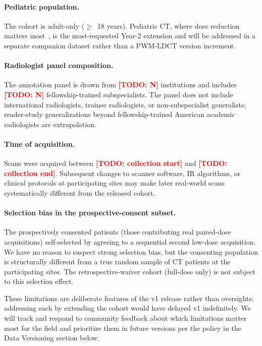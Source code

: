 \documentclass[twoside,11pt]{article}
\newcommand{\todo}[1]{\textcolor{red}{\textbf{[TODO: #1]}}}
\begin{document}
\paragraph{Pediatric population.} The cohort is adult-only ($\geq$~18 years). Pediatric CT, where dose reduction matters most~\citep{larson2018pediatric}, is the most-requested Year-2 extension and will be addressed in a separate companion dataset rather than a PWM-LDCT version increment.

\paragraph{Radiologist panel composition.} The annotation panel is drawn from \todo{N} institutions and includes \todo{N} fellowship-trained subspecialists. The panel does not include international radiologists, trainee radiologists, or non-subspecialist generalists; reader-study generalizations beyond fellowship-trained American academic radiologists are extrapolation.

\paragraph{Time of acquisition.} Scans were acquired between \todo{collection start} and \todo{collection end}. Subsequent changes to scanner software, IR algorithms, or clinical protocols at participating sites may make later real-world scans systematically different from the released cohort.

\paragraph{Selection bias in the prospective-consent subset.} The prospectively consented patients (those contributing real paired-dose acquisitions) self-selected by agreeing to a sequential second low-dose acquisition. We have no reason to suspect strong selection bias, but the consenting population is structurally different from a true random sample of CT patients at the participating sites. The retrospective-waiver cohort (full-dose only) is not subject to this selection effect.

These limitations are deliberate features of the v1 release rather than oversights; addressing each by extending the cohort would have delayed v1 indefinitely. We will track and respond to community feedback about which limitations matter most for the field and prioritize them in future versions per the policy in the Data Versioning section below.
\end{document}

